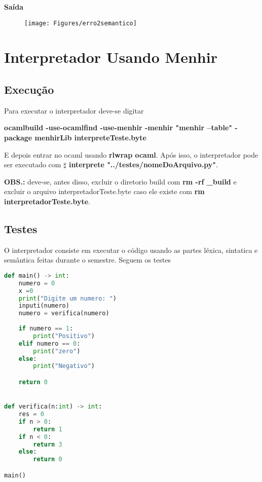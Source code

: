 \documentclass[hidelinks,12pt]{article}
\begin{document}
\textbf{{\large Saída}}

\begin{figure}[!h]
	\centering
	\texttt{[image: Figures/erro2semantico]}
\end{figure}	


\newpage
\section{Interpretador Usando Menhir}


\subsection{Execução}

Para executar o interpretador deve-se digitar

\textbf{ ocamlbuild -use-ocamlfind -use-menhir -menhir "menhir --table" -package menhirLib interpreteTeste.byte
	}
	
E depois entrar no ocaml usando \textbf{rlwrap ocaml}. Após isso,  o interpretador pode ser executado com \textbf{$\sharp$ interprete "../testes/nomeDoArquivo.py"}.

\textbf{OBS.:} deve-se, antes disso, excluir o diretorio build com \textbf{rm -rf \_build} e excluir o arquivo interpretadorTeste.byte caso ele existe com \textbf{rm interpretadorTeste.byte}.

\newpage

\subsection{Testes}
O interpretador consiste em executar o código usando as partes léxica, sintatica e semântica feitas durante o semestre. Seguem os testes



\begin{lstlisting}[caption=sintatico.mli, language=python]
def main() -> int:
	numero = 0
	x =0
	print("Digite um numero: ")
	inputi(numero)
	numero = verifica(numero)
	
	if numero == 1:
		print("Positivo")
	elif numero == 0:
		print("zero")
	else:
		print("Negativo")

	return 0


def verifica(n:int) -> int:
	res = 0
	if n > 0:
		return 1
	if n < 0:
		return 3
	else:
		return 0

main()

\end{lstlisting}
\end{document}
